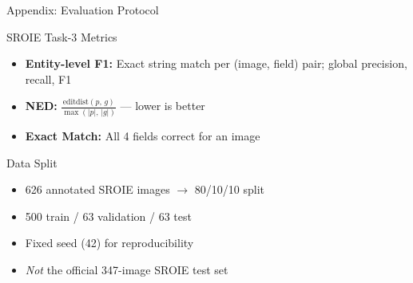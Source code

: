 \documentclass[aspectratio=169,11pt]{beamer}
\begin{document}
\begin{frame}[noframenumbering]{Appendix: Evaluation Protocol}
  \begin{block}{SROIE Task-3 Metrics}
    \begin{itemize}
      \item \textbf{Entity-level F1:} Exact string match per
            (image, field) pair; global precision, recall, F1
      \item \textbf{NED:}
            $\frac{\text{editdist}(p,\,g)}{\max(|p|,\,|g|)}$
            --- lower is better
      \item \textbf{Exact Match:} All 4 fields correct for an image
    \end{itemize}
  \end{block}

  \vspace{0.3cm}

  \begin{block}{Data Split}
    \begin{itemize}
      \item 626 annotated SROIE images $\to$ 80/10/10 split
      \item 500 train / 63 validation / 63 test
      \item Fixed seed (42) for reproducibility
      \item \textit{Not} the official 347-image SROIE test set
    \end{itemize}
  \end{block}
\end{frame}
\end{document}
